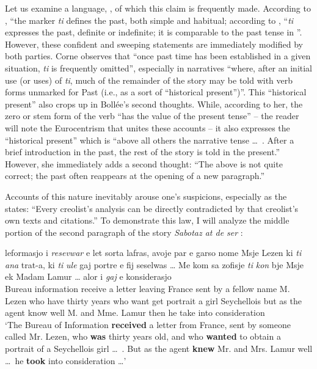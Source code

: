 Let us examine a language, , of which this claim is frequently made. According to \citet[102]{Corne1977}, ``the marker \textit{ti} defines the past, both simple and habitual{\textquotedbl}; according to \citet[55]{Bollee1977}, ``\textit{ti} expresses the past, definite or indefinite; it is comparable to the past tense in ''. However, these confident and sweeping statements are immediately modified by both parties. Corne observes that ``once past time has been established in a given situation, \textit{ti} is frequently omitted'', especially in narratives ``where, after an initial use (or uses) of \textit{ti}, much of the remainder of the story may be told with verb forms unmarked for Past (i.e., as a sort of ``historical present'')''. This ``historical present'' also crops up in Bollée's second thoughts. While, according to her, the zero or stem form of the verb ``has the value of the  present tense'' -- the reader will note the Euro\-centrism that unites these accounts -- it also expresses the ``historical present'' which is ``above all others the narrative tense \ldots~. After a brief introduction in the past, the rest of the story is told in the pres\-ent.'' However, she immediately adds a second thought: ``The above is not quite correct; the past often reappears at the opening of a new paragraph.''

Accounts of this nature inevitably arouse one's suspicions, especially as the  states: ``Every creolist's analysis can be directly contradicted by that creolist's own texts and citations.'' To demonstrate this law, I will analyze the middle portion of the second paragraph of the story \textit{Sabotaz at de ser} \citep[166]{Bollee1977}:

\ea\label{ex:2:94}
 {leformasjo} {i} \emph{resevwar} {e} {let} {sorta} {lafras,} {avoje} {par} {e} {garso} {nome} {M}{sje} {Lezen} {ki} \emph{ti} \emph{ana} {trat-a,} {ki} \emph{ti} \emph{ule} {gaj} {portre} {e} {fij} {seselwas} {\ldots } {Me} {kom} {sa} {zofisje} \emph{ti} \emph{kon} {b}{je} {Msje} {ek} {M}{adam} {Lamur} {\ldots} {alor} i \emph{gaj} {e} {konsiderasjo} \\
Bureau information {\PM} receive a letter leaving France sent by a fellow name M. Lezen who {\TNS} have {thirty years} who {\TNS} want get portrait a girl Seychellois { } but as the agent {\TNS} know well M. and Mme. Lamur { } then he take into consideration\\
\glt `The Bureau of Information \textbf{received} a letter from France, sent by someone called Mr. Lezen, who \textbf{was} thirty years old, and who \textbf{wanted} to obtain a portrait of a Seychellois girl \ldots~. But as the agent \textbf{knew} Mr. and Mrs. Lamur well \ldots~he \textbf{took} into consideration \ldots '
\z

